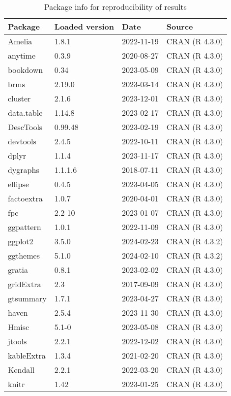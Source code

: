 \documentclass[
]{article}
\begin{document}
\begin{table}

\caption{\label{tab:Reproducibility-sessionInfo-R-packages}Package info for reproducibility of results}
\centering
\begin{tabular}[t]{llll}
\toprule
Package & Loaded version & Date & Source\\
\midrule
Amelia & 1.8.1 & 2022-11-19 & CRAN (R 4.3.0)\\
anytime & 0.3.9 & 2020-08-27 & CRAN (R 4.3.0)\\
bookdown & 0.34 & 2023-05-09 & CRAN (R 4.3.0)\\
brms & 2.19.0 & 2023-03-14 & CRAN (R 4.3.0)\\
cluster & 2.1.6 & 2023-12-01 & CRAN (R 4.3.0)\\
\addlinespace
data.table & 1.14.8 & 2023-02-17 & CRAN (R 4.3.0)\\
DescTools & 0.99.48 & 2023-02-19 & CRAN (R 4.3.0)\\
devtools & 2.4.5 & 2022-10-11 & CRAN (R 4.3.0)\\
dplyr & 1.1.4 & 2023-11-17 & CRAN (R 4.3.0)\\
dygraphs & 1.1.1.6 & 2018-07-11 & CRAN (R 4.3.0)\\
\addlinespace
ellipse & 0.4.5 & 2023-04-05 & CRAN (R 4.3.0)\\
factoextra & 1.0.7 & 2020-04-01 & CRAN (R 4.3.0)\\
fpc & 2.2-10 & 2023-01-07 & CRAN (R 4.3.0)\\
ggpattern & 1.0.1 & 2022-11-09 & CRAN (R 4.3.0)\\
ggplot2 & 3.5.0 & 2024-02-23 & CRAN (R 4.3.2)\\
\addlinespace
ggthemes & 5.1.0 & 2024-02-10 & CRAN (R 4.3.2)\\
gratia & 0.8.1 & 2023-02-02 & CRAN (R 4.3.0)\\
gridExtra & 2.3 & 2017-09-09 & CRAN (R 4.3.0)\\
gtsummary & 1.7.1 & 2023-04-27 & CRAN (R 4.3.0)\\
haven & 2.5.4 & 2023-11-30 & CRAN (R 4.3.0)\\
\addlinespace
Hmisc & 5.1-0 & 2023-05-08 & CRAN (R 4.3.0)\\
jtools & 2.2.1 & 2022-12-02 & CRAN (R 4.3.0)\\
kableExtra & 1.3.4 & 2021-02-20 & CRAN (R 4.3.0)\\
Kendall & 2.2.1 & 2022-03-20 & CRAN (R 4.3.0)\\
knitr & 1.42 & 2023-01-25 & CRAN (R 4.3.0)\\

\end{tabular}
\end{table}
\end{document}
